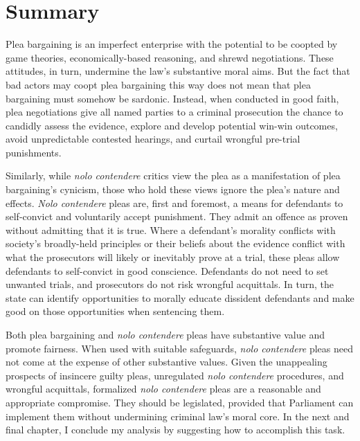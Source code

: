 \section{Summary}

Plea bargaining is an imperfect enterprise with the potential to be coopted by game theories, economically-based reasoning, and shrewd negotiations. These attitudes, in turn, undermine the law's substantive moral aims. But the fact that bad actors may coopt plea bargaining this way does not mean that plea bargaining must somehow be sardonic. Instead, when conducted in good faith, plea negotiations give all named parties to a criminal prosecution the chance to candidly assess the evidence, explore and develop potential win-win outcomes, avoid unpredictable contested hearings, and curtail wrongful pre-trial punishments.

Similarly, while \textit{nolo contendere} critics view the plea as a manifestation of plea bargaining's cynicism, those who hold these views ignore the plea's nature and effects. \textit{Nolo contendere} pleas are, first and foremost, a means for defendants to self-convict and voluntarily accept punishment. They admit an offence as proven without admitting that it is true. Where a defendant's morality conflicts with society's broadly-held principles or their beliefs about the evidence conflict with what the prosecutors will likely or inevitably prove at a trial, these pleas allow defendants to self-convict in good conscience. Defendants do not need to set unwanted trials, and prosecutors do not risk wrongful acquittals. In turn, the state can identify opportunities to morally educate dissident defendants and make good on those opportunities when sentencing them.

Both plea bargaining and \textit{nolo contendere} pleas have substantive value and promote fairness. When used with suitable safeguards, \textit{nolo contendere} pleas need not come at the expense of other substantive values. Given the unappealing prospects of insincere guilty pleas, unregulated \textit{nolo contendere} procedures, and wrongful acquittals, formalized \textit{nolo contendere} pleas are a reasonable and appropriate compromise. They should be legislated, provided that Parliament can implement them without undermining criminal law's moral core. In the next and final chapter, I conclude my analysis by suggesting how to accomplish this task.